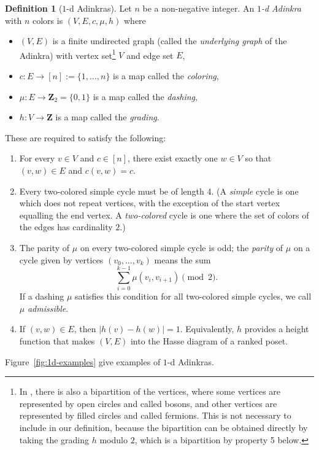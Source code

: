 \documentclass[12pt,twoside,singlespace]{article}
\numberwithin{equation}{section}
\theoremstyle{definition}
\newtheorem{definition}[equation]{Definition}
\newcommand{\ZZ}{\mathbf{Z}}
\begin{document}
\begin{definition}[$1$-d Adinkras]
Let $n$ be a non-negative integer.  An \emph{$1$-d Adinkra} with $n$ colors is $(V,E,c,\mu,h)$ where
\begin{itemize}
\item $(V,E)$ is a finite undirected graph (called the \emph{underlying graph} of the Adinkra) with vertex set\footnote{In \cite{d2l:first,d2l:graph-theoretic}, there is also a bipartition of the vertices, where some vertices are represented by open circles and called bosons, and other vertices are represented by filled circles and called fermions.  This is not necessary to include in our definition, because the bipartition can be obtained directly by taking the grading $h$ modulo $2$, which is a bipartition by property 5 below.}
 $V$ and edge set $E$,
\item $c:E\to [n] := \{1,\ldots,n\}$ is a map called the \emph{coloring},
\item $\mu:E\to \ZZ_2=\{0,1\}$ is a map called the \emph{dashing},
\item $h:V\to\ZZ$ is a map called the \emph{grading}.
\end{itemize}

These are required to satisfy the following:
\begin{enumerate}
\item For every $v\in V$ and $c\in [n]$, there exist exactly one $w\in V$ so that $(v,w)\in E$ and $c(v,w)=c$. 
\item Every two-colored simple cycle must be of length 4.  (A \emph{simple} cycle is one which does not repeat vertices, with the exception of the start vertex equalling the end vertex.  A \emph{two-colored} cycle is one where the set of colors of the edges has cardinality $2$.)
\item The parity of $\mu$ on every two-colored simple cycle is odd; the \emph{parity} of $\mu$ on a cycle given by vertices $(v_0,\ldots,v_k)$ means the sum
\[\sum_{i=0}^{k-1}\mu(v_i,v_{i+1})\pmod{2}.\]
If a dashing $\mu$ satisfies this condition for all two-colored simple cycles, we call $\mu$ \emph{admissible}.
\item If $(v,w)\in E$, then $|h(v)-h(w)|=1$. Equivalently, $h$ provides a height function that makes $(V,E)$ into the Hasse diagram of a ranked poset.
\end{enumerate}

Figure~\ref{fig:1d-examples} give examples of $1$-d Adinkras.
\end{definition}
\end{document}
